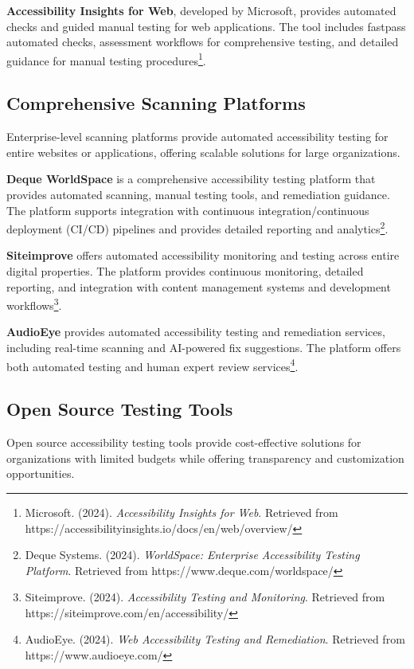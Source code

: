 \textbf{Accessibility Insights for Web}, developed by Microsoft, provides automated checks and guided manual testing for web applications. The tool includes fastpass automated checks, assessment workflows for comprehensive testing, and detailed guidance for manual testing procedures\footnote{Microsoft. (2024). \textit{Accessibility Insights for Web}. Retrieved from https://accessibilityinsights.io/docs/en/web/overview/}.

\subsection{Comprehensive Scanning Platforms}

Enterprise-level scanning platforms provide automated accessibility testing for entire websites or applications, offering scalable solutions for large organizations.

\textbf{Deque WorldSpace} is a comprehensive accessibility testing platform that provides automated scanning, manual testing tools, and remediation guidance. The platform supports integration with continuous integration/continuous deployment (CI/CD) pipelines and provides detailed reporting and analytics\footnote{Deque Systems. (2024). \textit{WorldSpace: Enterprise Accessibility Testing Platform}. Retrieved from https://www.deque.com/worldspace/}.

\textbf{Siteimprove} offers automated accessibility monitoring and testing across entire digital properties. The platform provides continuous monitoring, detailed reporting, and integration with content management systems and development workflows\footnote{Siteimprove. (2024). \textit{Accessibility Testing and Monitoring}. Retrieved from https://siteimprove.com/en/accessibility/}.

\textbf{AudioEye} provides automated accessibility testing and remediation services, including real-time scanning and AI-powered fix suggestions. The platform offers both automated testing and human expert review services\footnote{AudioEye. (2024). \textit{Web Accessibility Testing and Remediation}. Retrieved from https://www.audioeye.com/}.

\subsection{Open Source Testing Tools}

Open source accessibility testing tools provide cost-effective solutions for organizations with limited budgets while offering transparency and customization opportunities.

